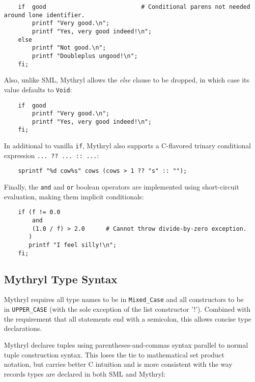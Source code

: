 \begin{verbatim}
    if  good                           # Conditional parens not needed around lone identifier.
        printf "Very good.\n";
        printf "Yes, very good indeed!\n";
    else
        printf "Not good.\n";
        printf "Doubleplus ungood!\n";
    fi;
\end{verbatim}

Also, unlike SML, Mythryl allows the {\it else} clause to be 
dropped, in which case its value defaults to {\tt Void}:

\begin{verbatim}
    if  good
        printf "Very good.\n";
        printf "Yes, very good indeed!\n";
    fi;
\end{verbatim}

In additional to vanilla {\tt if}, Mythryl also supports 
a C-flavored trinary conditional expression {\tt ... ?? ... :: ...}:

\begin{verbatim}
    sprintf "%d cow%s" cows (cows > 1 ?? "s" :: "");
\end{verbatim}

Finally, the {\tt and} and {\tt or} boolean operators are implemented using 
short-circuit evaluation, making them implicit conditionals:

\begin{verbatim}
    if (f != 0.0
        and
        (1.0 / f) > 2.0      # Cannot throw divide-by-zero exception.
       )
       printf "I feel silly!\n";
    fi;
\end{verbatim}

\cutend*


\subsection{Mythryl Type Syntax}

Mythryl requires all type names to be in {\tt Mixed\_Case} and all constructors 
to be in {\tt UPPER\_CASE} (with the sole exception of the list constructor '!'). 
Combined with the requirement that all statements 
end with a semicolon, this allows concise type declarations. 

Mythryl declares tuples using parentheses-and-commas syntax parallel to 
normal tuple construction syntax.  This loses the tie to mathematical 
set product notation, but carries better C intuition and is more consistent 
with the way records types are declared in both {\sc SML} and Mythryl: 


